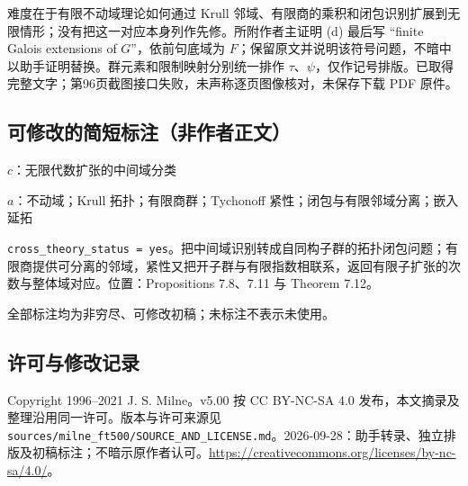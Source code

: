 \documentclass[UTF8,11pt]{ctexart}
\theoremstyle{definition}
\begin{document}
难度在于有限不动域理论如何通过 Krull 邻域、有限商的乘积和闭包识别扩展到无限情形；没有把这一对应本身列作先修。所附作者主证明 (d) 最后写 ``finite Galois extensions of $G$''，依前句底域为 $F$；保留原文并说明该符号问题，不暗中以助手证明替换。群元素和限制映射分别统一排作 $\tau$、$\psi$，仅作记号排版。已取得完整文字；第96页截图接口失败，未声称逐页图像核对，未保存下载 PDF 原件。
\subsection*{可修改的简短标注（非作者正文）}
$c$：无限代数扩张的中间域分类

$a$：不动域；Krull 拓扑；有限商群；Tychonoff 紧性；闭包与有限邻域分离；嵌入延拓

\texttt{cross\_theory\_status = yes}。把中间域识别转成自同构子群的拓扑闭包问题；有限商提供可分离的邻域，紧性又把开子群与有限指数相联系，返回有限子扩张的次数与整体域对应。位置：Propositions 7.8、7.11 与 Theorem 7.12。

全部标注均为非穷尽、可修改初稿；未标注不表示未使用。
\subsection*{许可与修改记录}
Copyright 1996--2021 J. S. Milne。v5.00 按 CC BY-NC-SA 4.0 发布，本文摘录及整理沿用同一许可。版本与许可来源见 \texttt{sources/milne\_ft500/SOURCE\_AND\_LICENSE.md}。2026-09-28：助手转录、独立排版及初稿标注；不暗示原作者认可。\url{https://creativecommons.org/licenses/by-nc-sa/4.0/}。
\end{document}
